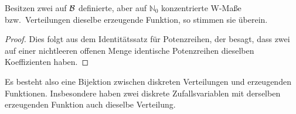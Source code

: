 \begin{prop}

\label{prop:6.1}
Besitzen zwei auf ${\mathcal{B}}$ definierte, aber auf $\mathbb{N}_{0}$ konzentrierte
W-Maße bzw.\ Verteilungen dieselbe erzeugende Funktion, so stimmen sie
überein.\fishhere
\end{prop}
\begin{proof}
Dies folgt aus dem Identitätssatz für Potenzreihen, der besagt, dass zwei
auf einer nichtleeren offenen Menge identische Potenzreihen dieselben
Koeffizienten haben.\qedhere
\end{proof}

Es besteht also eine Bijektion zwischen diskreten Verteilungen und erzeugenden
Funktionen. Insbesondere haben zwei diskrete Zufallsvariablen mit derselben
erzeugenden Funktion auch dieselbe Verteilung.


